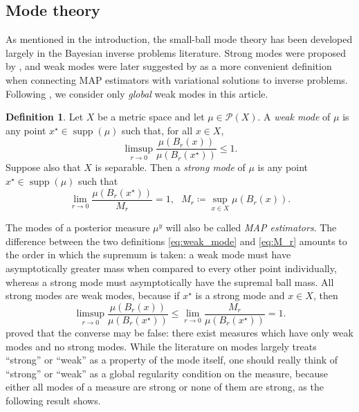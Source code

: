 \documentclass[11pt]{article}
\newcommand*{\cball}[2]{B_{#2}(#1)}
\newcommand*{\defeq}{\coloneqq}
\newcommand*{\defterm}{\emph}%
\newcommand*{\prob}[1]{\mathscr{P}(#1)}
\DeclareMathOperator*{\supp}{supp}
\renewcommand*{\leq}{\leqslant}
\newcommand*{\crcdf}[2]{\mu(\cball{#1}{#2})}
\theoremstyle{plain}
\theoremstyle{definition}
\newtheorem{definition}[theorem]{Definition}
\numberwithin{equation}{section}
\numberwithin{figure}{section}
\numberwithin{table}{section}
\begin{document}
\subsection{Mode theory}
\label{subsection:modes}

As mentioned in the introduction, the small-ball mode theory has been developed largely in the Bayesian inverse problems literature.
Strong modes were proposed by \citet{DashtiLawStuartVoss2013}, and weak modes were later suggested by \citet{HelinBurger2015} as a more convenient definition when connecting MAP estimators with variational solutions to inverse problems.
Following \citet{AyanbayevKlebanovLieSullivan2022a}, we consider only \defterm{global} weak modes in this article.

\begin{definition}
	\label{def:mode}
	Let $X$ be a metric space and let $\mu \in \prob{X}$.
	A \defterm{weak mode} of $\mu$ is any point $x^{\star} \in \supp(\mu)$ such that, for all $x \in X$,
	\begin{equation} \label{eq:weak_mode}
		\limsup_{r \to 0} \frac{\crcdf{x}{r}}{\crcdf{x^{\star}}{r}} \leq 1.
	\end{equation}
	Suppose also that $X$ is separable. 
	Then a \defterm{strong mode} of $\mu$ is any point $x^{\star} \in \supp(\mu)$ such that
	\begin{equation} \label{eq:M_r}
		\lim_{r \to 0} \frac{\crcdf{x^{\star}}{r}}{M_r} = 1,~~~M_r \defeq \sup_{x \in X} \crcdf{x}{r}.
	\end{equation}
\end{definition}

The modes of a posterior measure $\mu^y$ will also be called \emph{MAP estimators}.
The difference between the two definitions \eqref{eq:weak_mode} and \eqref{eq:M_r} amounts to the order in which the supremum is taken:
a weak mode must have asymptotically greater mass when compared to every other point individually, whereas a strong mode must asymptotically have the supremal ball mass.
All strong modes are weak modes, because if $x^{\star}$ is a strong mode and $x \in X$, then
\begin{equation*}
	\limsup_{r \to 0} \frac{\crcdf{x}{r}}{\crcdf{x^{\star}}{r}} \leq \lim_{r \to 0} \frac{M_r}{\crcdf{x^{\star}}{r}} = 1.
\end{equation*}
\citet{LieSullivan2018} proved that the converse may be false:
there exist measures which have only weak modes and no strong modes.
While the literature on modes largely treats ``strong'' or ``weak'' as a property of the mode itself, one should really think of ``strong'' or ``weak'' as a global regularity condition on the measure, because either all modes of a measure are strong or none of them are strong, as the following result shows.
\end{document}
